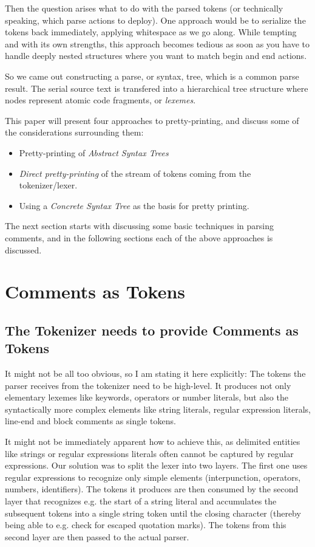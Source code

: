 \documentclass[11pt,a4paper]{article}
\begin{document}
Then the question arises what to do with the parsed tokens (or technically
speaking, which parse actions to deploy). One approach would be to serialize the
tokens back immediately, applying whitespace as we go along. While tempting and
with its own strengths, this approach becomes tedious as soon as you have to handle
deeply nested structures where you want to match begin and end actions.

So we came out constructing a parse, or syntax, tree, which is a common parse
result. The serial source text is transfered into a hierarchical tree structure
where nodes represent atomic code fragments, or \emph{lexemes}.

This paper will present four approaches to pretty-printing, and discuss some of the considerations surrounding them:
\begin{itemize}
  \item Pretty-printing of \emph{Abstract Syntax Trees}
  \item \emph{Direct pretty-printing} of the stream of tokens coming from the tokenizer/lexer.
  \item Using a \emph{Concrete Syntax Tree} as the basis for pretty printing.
\end{itemize}

The next section starts with discussing some basic techniques in parsing comments, and in the following sections each of the above approaches is discussed.


\section{Comments as Tokens}

\subsection{The Tokenizer needs to provide Comments as Tokens}

It might not be all too obvious, so I am stating it here explicitly: The tokens the
parser receives from the tokenizer need to be high-level. It produces not only
elementary lexemes like keywords, operators or number literals, but also the
syntactically more complex elements like string literals, regular expression
literals, line-end and block comments as single tokens.

It might not be immediately apparent how to achieve this, as delimited entities
like strings or regular expressions literals often cannot be captured by regular
expressions. Our solution was to split the lexer into two layers. The first one
uses regular expressions to recognize only simple elements (interpunction,
operators, numbers, identifiers). The tokens it produces are then consumed by
the second layer that recognizes e.g. the start of a string literal and
accumulates the subsequent tokens into a single string token until the closing
character (thereby being able to e.g. check for escaped quotation marks). The
tokens from this second layer are then passed to the actual parser.
\end{document}
